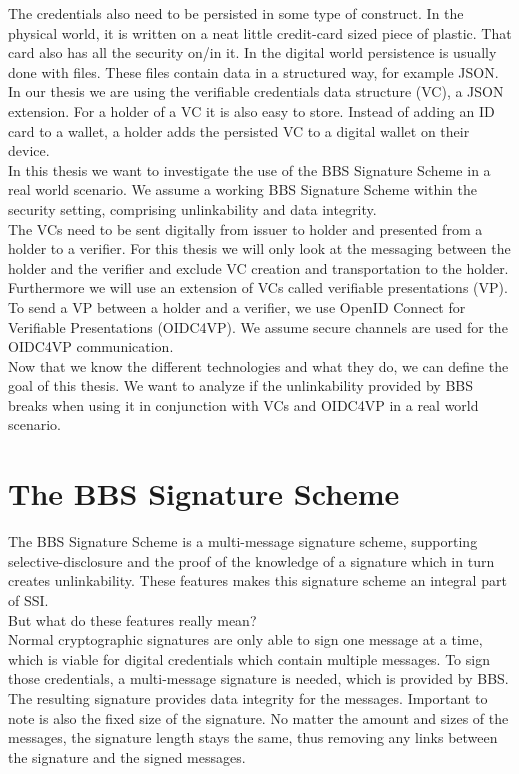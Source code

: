 \documentclass[
	a4paper               %
	,BCOR=0mm            %
	,bibliography=totoc   %
	,listof=totoc         %
	,monolingual
	,twoside=false
]{bfhthesis}              %
\begin{document}
The credentials also need to be persisted in some type of construct. In the physical world, it is written on a neat little credit-card sized piece of plastic. That card also has all the security on/in it. In the digital world persistence is usually done with files. These files contain data in a structured way, for example JSON. In our thesis we are using the verifiable credentials data structure (VC)\cite{verifiable-credentials}, a JSON extension. For a holder of a VC it is also easy to store. Instead of adding an ID card to a wallet, a holder adds the persisted VC to a digital wallet on their device. \\

In this thesis we want to investigate the use of the BBS Signature Scheme in a real world scenario.
We assume a working BBS Signature Scheme within the security setting, comprising unlinkability and data integrity.\\

The VCs need to be sent digitally from issuer to holder and presented from a holder to a verifier. 
For this thesis we will only look at the messaging between the holder and the verifier and exclude VC creation and transportation to the holder.
Furthermore we will use an extension of VCs called verifiable presentations (VP)\cite{verifiable-credentials}.
To send a VP between a holder and a verifier, we use OpenID Connect for Verifiable Presentations (OIDC4VP)\cite{oidc4vp}.
We assume secure channels are used for the OIDC4VP communication.\\

Now that we know the different technologies and what they do, we can define the goal of this thesis. We want to analyze if the unlinkability provided by BBS breaks when using it in conjunction with VCs and OIDC4VP in a real world scenario.


\chapter{The BBS Signature Scheme}
The BBS Signature Scheme\cite{bbs-signature-scheme} is a multi-message signature scheme, supporting selective-disclosure and the proof of the knowledge of a signature which in turn creates unlinkability. These features makes this signature scheme an integral part of SSI.\\

\noindent
But what do these features really mean? \\

Normal cryptographic signatures are only able to sign one message at a time, which is viable for digital credentials which contain multiple messages. To sign those credentials, a multi-message signature is needed, which is provided by BBS. The resulting signature provides data integrity for the messages. Important to note is also the fixed size of the signature. No matter the amount and sizes of the messages, the signature length stays the same, thus removing any links between the signature and the signed messages.\\
\end{document}
